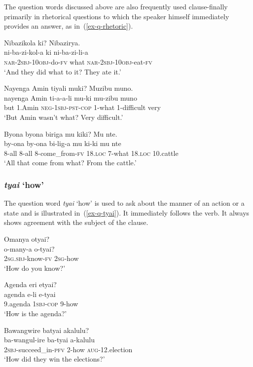 The question words discussed above are also frequently used clause-finally primarily in rhetorical questions to which the speaker himself immediately provides an answer, as in~(\ref{ex-q-rhetoric}). 

\ea \label{ex-q-rhetoric}
\begin{xlist}
\ex	\label{ex-q-rhetoric-a}
	\glll Nibazikola ki? Nibazirya.\\
		 ni-ba-zi-kol-a ki ni-ba-zi-li-a\\
		\textsc{nar}-\textsc{2sbj}-\textsc{10obj}-do-\textsc{fv} what \textsc{nar}-\textsc{2sbj}-\textsc{10obj}-eat-\textsc{fv}\\
	\glt `And they did what to it? They ate it.'

\ex	\label{ex-q-rhetoric-muki}
	\glll Nayenga Amin tiyali muki? Muzibu muno.\\
		 nayenga Amin ti-a-a-li mu-ki mu-zibu muno\\
		but 1.Amin \textsc{neg}-\textsc{1sbj}-\textsc{pst}-\textsc{cop} 1-what 1-difficult very\\
	\glt `But Amin wasn't what? Very difficult.'
	
\ex	\label{ex-q-rhetoric-c}
	\glll Byona byona biriga mu kiki? Mu nte.\\
		 by-ona by-ona bi-lig-a mu ki-ki mu nte\\
		8-all 8-all 		8-come\_from-\textsc{fv} 18.\textsc{loc} 7-what 18.\textsc{loc} 10.cattle\\
	\glt `All that come from what? From the cattle.'
\end{xlist}
\z


\subsubsection{\emph{tyai} `how'}  

The question word  \emph{tyai} `how' is used to ask about the manner of an action or a state and is illustrated in~(\ref{ex-q-tyai}). 
It immediately follows the verb. 
It always shows agreement with the subject of the clause. 

\ea \label{ex-q-tyai}
\begin{xlist}
\ex \label{ex-q-tyai-1}
	\glll Omanya otyai?\\
		 o-many-a o-tyai?\\
		2\textsc{sg.sbj}-know-\textsc{fv} 2\textsc{sg}-how\\
	\glt `How do you know?'

\ex 	\label{ex-q-tyai-2}
	\glll Agenda eri etyai?\\
		agenda e-li 	e-tyai\\
		9.agenda \textsc{1sbj}-\textsc{cop}	9-how\\
	\glt	`How is the agenda?'
	
\ex 	\label{ex-q-tyai-3}
	\glll Bawangwire batyai akalulu?\\
		ba-wangul-ire ba-tyai a-kalulu\\
		\textsc{2sbj}-succeed\_in-\textsc{pfv} 2-how \textsc{aug}-12.election\\
	\glt	`How did they win the elections?'
\end{xlist}
\z


